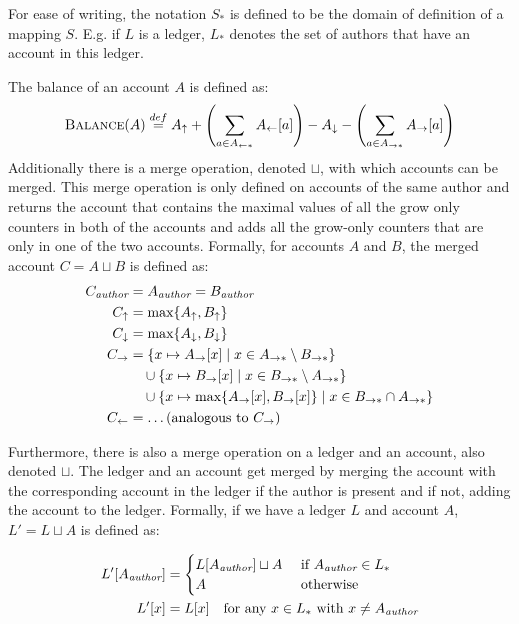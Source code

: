 For ease of writing, the notation $S_*$ is defined to be the domain of definition of a mapping $S$. E.g. if $L$ is a ledger, $L_*$ denotes the set of authors that have an account in this ledger.

The balance of an account $A$ is defined as: \[\balance(A) \definedas A_\uparrow + \left(\sum_{a \in A_{\leftarrow*}} A_\leftarrow[a]\right) - A_\downarrow - \left(\sum_{a \in A_{\rightarrow*}} A_\rightarrow[a]\right)\]
Additionally there is a merge operation, denoted $\sqcup$, with which accounts can be merged. This merge operation is only defined on accounts of the same author and returns the account that contains the maximal values of all the grow only counters in both of the accounts and adds all the grow-only counters that are only in one of the two accounts. Formally, for accounts $A$ and $B$, the merged account $C = A \sqcup B$ is defined as:
\begin{align*}
    C_\emph{author} &= A_\emph{author} = B_\emph{author}\\
    C_\uparrow &= \max\{A_\uparrow, B_\uparrow\}\\
    C_\downarrow &= \max\{A_\downarrow, B_\downarrow\}\\
    C_\rightarrow &= \{x \mapsto A_\rightarrow[x] \mid x \in A_{\rightarrow*} \setminus B_{\rightarrow*}\} \\
    &\quad \cup \{x \mapsto B_\rightarrow[x] \mid x \in B_{\rightarrow*} \setminus A_{\rightarrow*}\} \\
    &\quad \cup \{x \mapsto \max\{A_\rightarrow[x], B_\rightarrow[x]\} \mid x \in B_{\rightarrow*} \cap A_{\rightarrow*}\}\\
    C_\leftarrow &= \ldots \text{(analogous to $C_\rightarrow$)}\\
\end{align*}


Furthermore, there is also a merge operation on a ledger and an account, also denoted $\sqcup$. The ledger and an account get merged by merging the account with the corresponding account in the ledger if the author is present and if not, adding the account to the ledger. Formally, if we have a ledger $L$ and account $A$, $L' = L \sqcup A$ is defined as:

\begin{align*}
    L'[A_\emph{author}] &=\begin{cases} L[A_\emph{author}] \sqcup A & \text{ if } A_\emph{author} \in L_* \\
            A & \text{ otherwise}
        \end{cases}\\
    L'[x] &= L[x] \quad \text{for any $x \in L_*$ with $x \ne A_\emph{author}$}
\end{align*}

